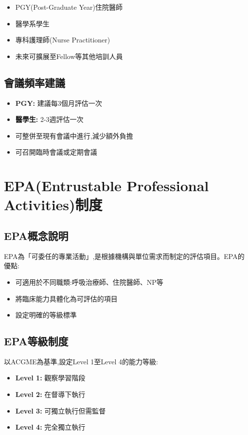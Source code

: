 \documentclass[12pt,a4paper]{article}
\begin{document}
\begin{itemize}[leftmargin=*]
    \item PGY(Post-Graduate Year)住院醫師
    \item 醫學系學生
    \item 專科護理師(Nurse Practitioner)
    \item 未來可擴展至Fellow等其他培訓人員
\end{itemize}

\subsection{會議頻率建議}

\begin{itemize}[leftmargin=*]
    \item \textbf{PGY:} 建議每3個月評估一次
    \item \textbf{醫學生:} 2-3週評估一次
    \item 可整併至現有會議中進行,減少額外負擔
    \item 可召開臨時會議或定期會議
\end{itemize}

\section{EPA(Entrustable Professional Activities)制度}

\subsection{EPA概念說明}

EPA為「可委任的專業活動」,是根據機構與單位需求而制定的評估項目。EPA的優點:

\begin{itemize}[leftmargin=*]
    \item 可適用於不同職類:呼吸治療師、住院醫師、NP等
    \item 將臨床能力具體化為可評估的項目
    \item 設定明確的等級標準
\end{itemize}

\subsection{EPA等級制度}

以ACGME為基準,設定Level 1至Level 4的能力等級:
\begin{itemize}[leftmargin=*]
    \item \textbf{Level 1:} 觀察學習階段
    \item \textbf{Level 2:} 在督導下執行
    \item \textbf{Level 3:} 可獨立執行但需監督
    \item \textbf{Level 4:} 完全獨立執行
\end{itemize}
\end{document}

